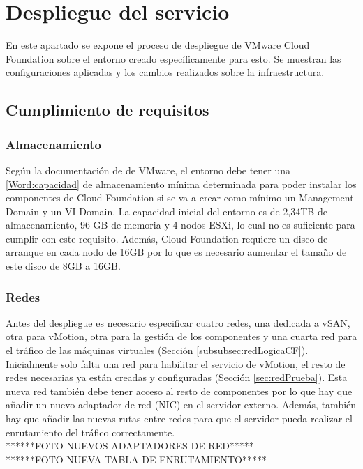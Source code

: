 

\section{Despliegue del servicio}
En este apartado se expone el proceso de despliegue de VMware Cloud Foundation sobre el entorno creado específicamente para esto. Se muestran las configuraciones aplicadas y los cambios realizados sobre la infraestructura.

\subsection{Cumplimiento de requisitos}

\subsubsection{Almacenamiento}
Según la documentación de de VMware, el entorno debe tener una \ref{Word:capacidad} de almacenamiento mínima determinada para poder instalar los componentes de Cloud Foundation si se va a crear como mínimo un Management Domain y un VI Domain. La capacidad inicial del entorno es de 2,34TB de almacenamiento, 96 GB de memoria y 4 nodos ESXi, lo cual no es suficiente para cumplir con este requisito.
Además, Cloud Foundation requiere un disco de arranque en cada nodo de 16GB por lo que es necesario aumentar el tamaño de este disco de 8GB a 16GB.


\subsubsection{Redes}
Antes del despliegue es necesario especificar cuatro redes, una dedicada a vSAN, otra para vMotion, otra para la gestión de los componentes y una cuarta red para el tráfico de las máquinas virtuales (Sección \ref{subsubsec:redLogicaCF}). Inicialmente solo falta una red para habilitar el servicio de vMotion, el resto de redes necesarias ya están creadas y configuradas (Sección \ref{sec:redPrueba}). Esta nueva red también debe tener acceso al resto de componentes por lo que hay que añadir un nuevo adaptador de red (NIC) en el servidor externo. Además, también hay que añadir las nuevas rutas entre redes para que el servidor pueda realizar el enrutamiento del tráfico correctamente.\\
******FOTO NUEVOS ADAPTADORES DE RED*****\\
******FOTO NUEVA TABLA DE ENRUTAMIENTO*****\\


